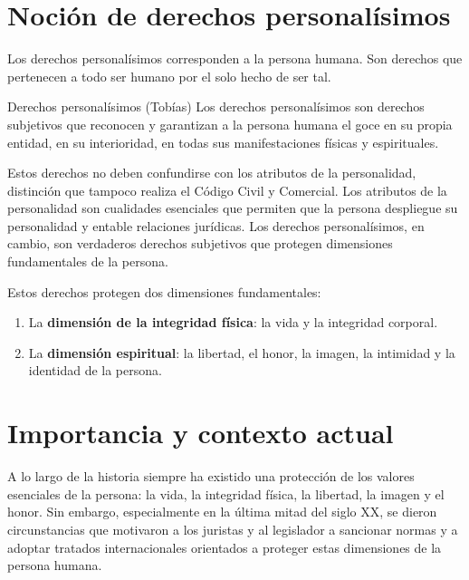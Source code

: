 \documentclass[12pt,oneside]{book}
\begin{document}

\section{Noción de derechos personalísimos}

Los derechos personalísimos corresponden a la persona humana. Son derechos que pertenecen a todo ser humano por el solo hecho de ser tal.

\begin{definition}{Derechos personalísimos (Tobías)}
Los derechos personalísimos son derechos subjetivos que reconocen y garantizan a la persona humana el goce en su propia entidad, en su interioridad, en todas sus manifestaciones físicas y espirituales.
\end{definition}

Estos derechos no deben confundirse con los atributos de la personalidad, distinción que tampoco realiza el Código Civil y Comercial. Los atributos de la personalidad son cualidades esenciales que permiten que la persona despliegue su personalidad y entable relaciones jurídicas. Los derechos personalísimos, en cambio, son verdaderos derechos subjetivos que protegen dimensiones fundamentales de la persona.

Estos derechos protegen dos dimensiones fundamentales:

\begin{enumerate}
    \item La \textbf{dimensión de la integridad física}: la vida y la integridad corporal.
    \item La \textbf{dimensión espiritual}: la libertad, el honor, la imagen, la intimidad y la identidad de la persona.
\end{enumerate}

\section{Importancia y contexto actual}

A lo largo de la historia siempre ha existido una protección de los valores esenciales de la persona: la vida, la integridad física, la libertad, la imagen y el honor. Sin embargo, especialmente en la última mitad del siglo XX, se dieron circunstancias que motivaron a los juristas y al legislador a sancionar normas y a adoptar tratados internacionales orientados a proteger estas dimensiones de la persona humana.
\end{document}
